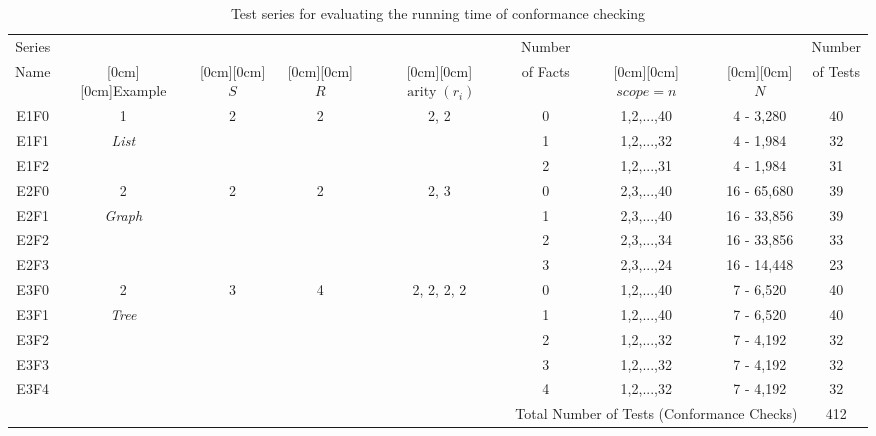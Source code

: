     \begin{singlespacing}
    \begin{table}[H]
    \begin{center}
    \caption{Test series for evaluating the running time of conformance checking}
    \begin{tabular}{|c|c|c|c|c|c|c|c|c|} \hline
      Series &  &  &  &  & Number &  &  & Number \\
      Name &
      \raisebox{1.5ex}[0cm][0cm]{Example} &
      \raisebox{1.5ex}[0cm][0cm]{$S$} &
      \raisebox{1.5ex}[0cm][0cm]{$R$} &
      \raisebox{1.5ex}[0cm][0cm]{$\operatorname{arity}(r_i)$} &
      of Facts &
      \raisebox{1.5ex}[0cm][0cm]{$scope=n$} &
      \raisebox{1.5ex}[0cm][0cm]{$N$} &
      of Tests \\ \hline

      E1F0 & 1            & 2 & 2 & 2, 2        & 0 & 1,2,...,40 & 4 - 3,280   & 40 \\ \cline{1-1} \cline{6-9}
      E1F1 & \emph{List}  &   &   &             & 1 & 1,2,...,32 & 4 - 1,984   & 32 \\ \cline{1-1} \cline{6-9}
      E1F2 &              &   &   &             & 2 & 1,2,...,31 & 4 - 1,984   & 31 \\ \hline
      E2F0 & 2            & 2 & 2 & 2, 3        & 0 & 2,3,...,40 & 16 - 65,680 & 39 \\ \cline{1-1} \cline{6-9}
      E2F1 & \emph{Graph} &   &   &             & 1 & 2,3,...,40 & 16 - 33,856 & 39 \\ \cline{1-1}\cline{6-9}
      E2F2 &              &   &   &             & 2 & 2,3,...,34 & 16 - 33,856 & 33 \\ \cline{1-1}\cline{6-9}
      E2F3 &              &   &   &             & 3 & 2,3,...,24 & 16 - 14,448 & 23 \\ \hline
      E3F0 & 2            & 3 & 4 & 2, 2, 2, 2  & 0 & 1,2,...,40 & 7 - 6,520   & 40 \\ \cline{1-1} \cline{6-9}
      E3F1 & \emph{Tree}  &   &   &             & 1 & 1,2,...,40 & 7 - 6,520   & 40 \\ \cline{1-1}\cline{6-9}
      E3F2 &              &   &   &             & 2 & 1,2,...,32 & 7 - 4,192   & 32 \\ \cline{1-1}\cline{6-9}
      E3F3 &              &   &   &             & 3 & 1,2,...,32 & 7 - 4,192   & 32 \\ \cline{1-1}\cline{6-9}
      E3F4 &              &   &   &             & 4 & 1,2,...,32 & 7 - 4,192   & 32 \\ \hline
      \multicolumn{8}{|r|}{Total Number of Tests (Conformance Checks)} & 412 \\ \hline
    \end{tabular}
    \label{table:tests}
    \end{center}
    \end{table}
    \end{singlespacing}

